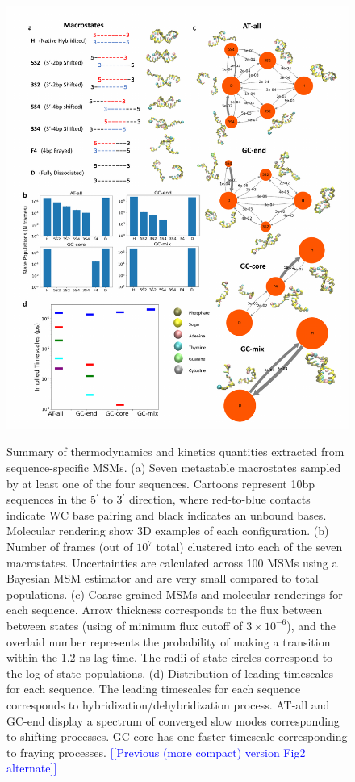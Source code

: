 \documentclass[journal=jpcbfk,manuscript=article]{achemso}
\newcommand*{\noteb}[1]{\textcolor{blue}{[[#1]]}}		%
\begin{document}
\begin{figure}[ht!]
	\begin{center}
        \includegraphics[width=170mm, scale=1]{Fig2.pdf}
	\end{center}
\end{figure}
\begin{figure}[ht!]
        \caption{ Summary of thermodynamics and kinetics quantities extracted from sequence-specific MSMs. (a) Seven metastable macrostates sampled by at least one of the four sequences. Cartoons represent 10bp sequences in the 5$^\prime$ to 3$^\prime$ direction, where red-to-blue contacts indicate WC base pairing and black indicates an unbound bases. Molecular rendering show 3D examples of each configuration. (b) Number of frames (out of $10^7$ total) clustered into each of the seven macrostates. Uncertainties are calculated across 100 MSMs using a Bayesian MSM estimator and are very small compared to total populations. (c) Coarse-grained MSMs and molecular renderings for each sequence. Arrow thickness corresponds to the flux between between states (using of minimum flux cutoff of $3\times10^{-6}$), and the overlaid number represents the probability of making a transition within the 1.2 ns lag time. The radii of state circles correspond to the log of state populations. (d) Distribution of leading timescales for each sequence. The leading timescales for each sequence corresponds to hybridization/dehybridization process. AT-all and GC-end display a spectrum of converged slow modes corresponding to shifting processes. GC-core has one faster timescale corresponding to fraying processes.
        \noteb{Previous (more compact) version Fig2 alternate}
    }
    \label{fig:allseq_table}
\end{figure}
\end{document}
